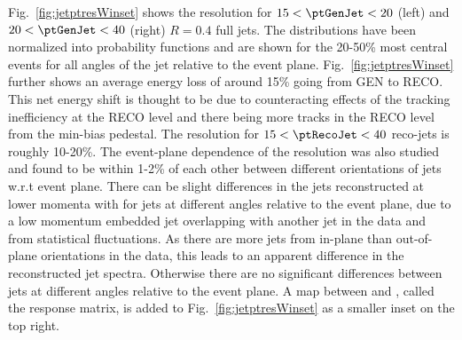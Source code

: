 


Fig.~\ref{fig:jetptresWinset} shows the  resolution for $15 < \ptGenJet < 20$ \GeVc (left) and $20 < \ptGenJet < 40$ \GeVc (right) $R=0.4$ full jets.  The distributions have been normalized into probability functions and are shown for the 20-50\% most central events for all angles of the jet relative to the event plane.  Fig.~\ref{fig:jetptresWinset} further shows an average energy loss of around 15\% going from GEN to RECO. This net energy shift is thought to be due to counteracting effects of the tracking inefficiency at the RECO level and there being more tracks in the RECO level from the min-bias pedestal. The  resolution for $15 < \ptRecoJet < 40$ \GeVc reco-jets is roughly 10-20\%.  The event-plane dependence of the  resolution was also studied and found to be within 1-2\% of each other between different orientations of jets w.r.t event plane.  There can be slight differences in the jets reconstructed at lower momenta with  for jets at different angles relative to the event plane, due to a low momentum embedded jet overlapping with another jet in the \AuAu data and from statistical fluctuations.  As there are more jets from in-plane than out-of-plane orientations in the data, this leads to an apparent difference in the reconstructed jet spectra. Otherwise there are no significant differences between jets at different angles relative to the event plane. A map between \ptGenJet and  \ptRecoJet, called the response matrix, is added to Fig.~\ref{fig:jetptresWinset} as a smaller inset on the top right.   

